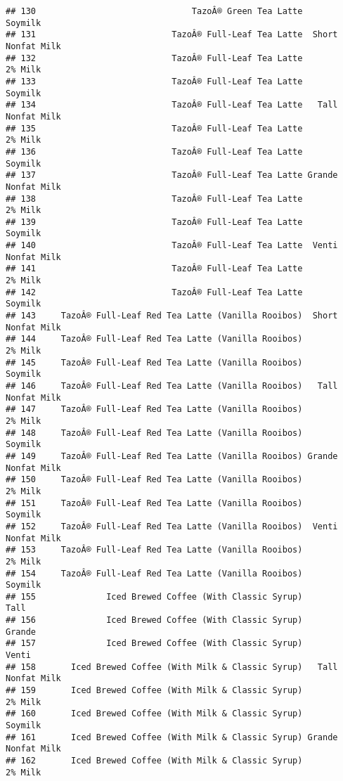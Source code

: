 \documentclass[
]{article}
\begin{document}
\begin{verbatim}
## 130                               TazoÂ® Green Tea Latte            Soymilk
## 131                           TazoÂ® Full-Leaf Tea Latte  Short Nonfat Milk
## 132                           TazoÂ® Full-Leaf Tea Latte            2% Milk
## 133                           TazoÂ® Full-Leaf Tea Latte            Soymilk
## 134                           TazoÂ® Full-Leaf Tea Latte   Tall Nonfat Milk
## 135                           TazoÂ® Full-Leaf Tea Latte            2% Milk
## 136                           TazoÂ® Full-Leaf Tea Latte            Soymilk
## 137                           TazoÂ® Full-Leaf Tea Latte Grande Nonfat Milk
## 138                           TazoÂ® Full-Leaf Tea Latte            2% Milk
## 139                           TazoÂ® Full-Leaf Tea Latte            Soymilk
## 140                           TazoÂ® Full-Leaf Tea Latte  Venti Nonfat Milk
## 141                           TazoÂ® Full-Leaf Tea Latte            2% Milk
## 142                           TazoÂ® Full-Leaf Tea Latte            Soymilk
## 143     TazoÂ® Full-Leaf Red Tea Latte (Vanilla Rooibos)  Short Nonfat Milk
## 144     TazoÂ® Full-Leaf Red Tea Latte (Vanilla Rooibos)            2% Milk
## 145     TazoÂ® Full-Leaf Red Tea Latte (Vanilla Rooibos)            Soymilk
## 146     TazoÂ® Full-Leaf Red Tea Latte (Vanilla Rooibos)   Tall Nonfat Milk
## 147     TazoÂ® Full-Leaf Red Tea Latte (Vanilla Rooibos)            2% Milk
## 148     TazoÂ® Full-Leaf Red Tea Latte (Vanilla Rooibos)            Soymilk
## 149     TazoÂ® Full-Leaf Red Tea Latte (Vanilla Rooibos) Grande Nonfat Milk
## 150     TazoÂ® Full-Leaf Red Tea Latte (Vanilla Rooibos)            2% Milk
## 151     TazoÂ® Full-Leaf Red Tea Latte (Vanilla Rooibos)            Soymilk
## 152     TazoÂ® Full-Leaf Red Tea Latte (Vanilla Rooibos)  Venti Nonfat Milk
## 153     TazoÂ® Full-Leaf Red Tea Latte (Vanilla Rooibos)            2% Milk
## 154     TazoÂ® Full-Leaf Red Tea Latte (Vanilla Rooibos)            Soymilk
## 155              Iced Brewed Coffee (With Classic Syrup)               Tall
## 156              Iced Brewed Coffee (With Classic Syrup)             Grande
## 157              Iced Brewed Coffee (With Classic Syrup)              Venti
## 158       Iced Brewed Coffee (With Milk & Classic Syrup)   Tall Nonfat Milk
## 159       Iced Brewed Coffee (With Milk & Classic Syrup)            2% Milk
## 160       Iced Brewed Coffee (With Milk & Classic Syrup)            Soymilk
## 161       Iced Brewed Coffee (With Milk & Classic Syrup) Grande Nonfat Milk
## 162       Iced Brewed Coffee (With Milk & Classic Syrup)            2% Milk

\end{verbatim}
\end{document}
